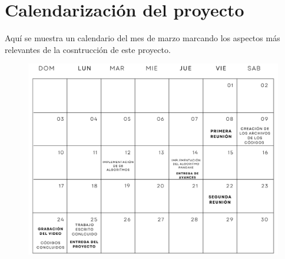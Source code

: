 \documentclass[a4paper,12pt]{article}
\begin{document}
\newpage
\section{Calendarización del proyecto}

Aquí se muestra un calendario del mes de marzo marcando los aspectos más relevantes de la cosntrucción de este proyecto.

\begin{figure}[h] 
    \centering
    \includegraphics[width=1\textwidth]{media/Calendarizacion.jpg} 
\end{figure}
\end{document}
